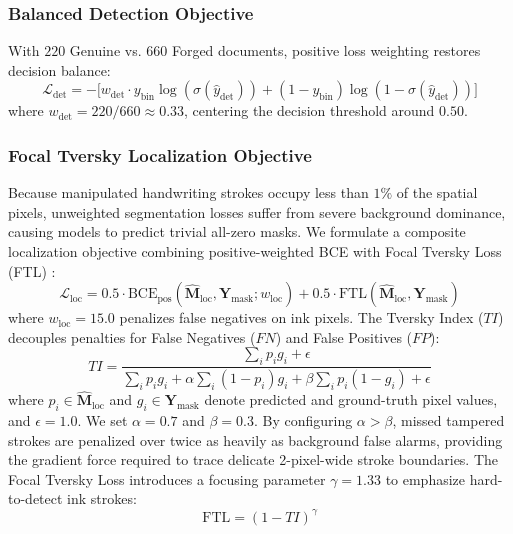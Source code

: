 \documentclass[runningheads]{llncs}
\begin{document}
\subsubsection{Balanced Detection Objective}
With $220$ Genuine vs. $660$ Forged documents, positive loss weighting restores decision balance:
\begin{equation}
\mathcal{L}_{\text{det}} = - \Big[ w_{\text{det}} \cdot y_{\text{bin}} \log(\sigma(\hat{y}_{\text{det}})) + (1 - y_{\text{bin}}) \log(1 - \sigma(\hat{y}_{\text{det}})) \Big]\label{eq_loss_det}
\end{equation}
where $w_{\text{det}} = 220 / 660 \approx 0.33$, centering the decision threshold around $0.50$.

\subsubsection{Focal Tversky Localization Objective}
Because manipulated handwriting strokes occupy less than $1\%$ of the spatial pixels, unweighted segmentation losses suffer from severe background dominance, causing models to predict trivial all-zero masks. We formulate a composite localization objective combining positive-weighted BCE with Focal Tversky Loss (FTL) \cite{bib16,bib17}:
\begin{equation}
\mathcal{L}_{\text{loc}} = 0.5 \cdot \text{BCE}_{\text{pos}}(\hat{\mathbf{M}}_{\text{loc}}, \mathbf{Y}_{\text{mask}}; w_{\text{loc}}) + 0.5 \cdot \text{FTL}(\hat{\mathbf{M}}_{\text{loc}}, \mathbf{Y}_{\text{mask}})\label{eq_loss_loc}
\end{equation}
where $w_{\text{loc}} = 15.0$ penalizes false negatives on ink pixels. The Tversky Index ($TI$) decouples penalties for False Negatives ($FN$) and False Positives ($FP$):
\begin{equation}
TI = \frac{\sum_i p_i g_i + \epsilon}{\sum_i p_i g_i + \alpha \sum_i (1 - p_i) g_i + \beta \sum_i p_i (1 - g_i) + \epsilon}\label{eq_tversky}
\end{equation}
where $p_i \in \hat{\mathbf{M}}_{\text{loc}}$ and $g_i \in \mathbf{Y}_{\text{mask}}$ denote predicted and ground-truth pixel values, and $\epsilon = 1.0$. We set $\alpha = 0.7$ and $\beta = 0.3$. By configuring $\alpha > \beta$, missed tampered strokes are penalized over twice as heavily as background false alarms, providing the gradient force required to trace delicate 2-pixel-wide stroke boundaries. The Focal Tversky Loss introduces a focusing parameter $\gamma = 1.33$ to emphasize hard-to-detect ink strokes:
\begin{equation}
\text{FTL} = (1 - TI)^\gamma\label{eq_ftl}
\end{equation}
\end{document}

